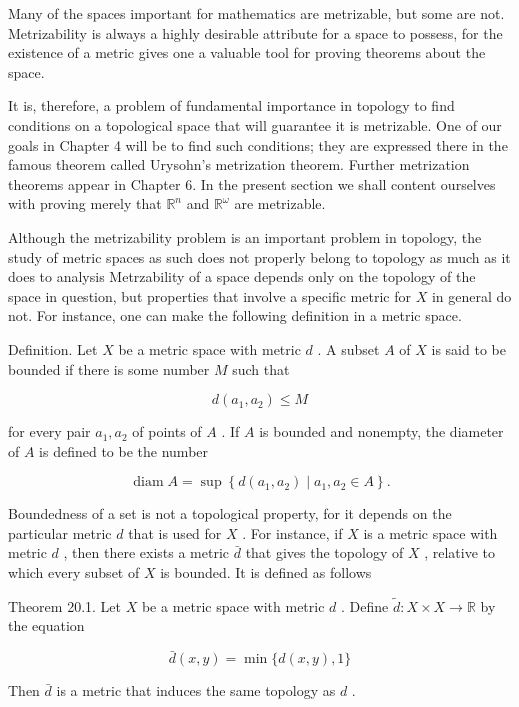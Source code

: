 Many of the spaces important for mathematics are metrizable, but some are not. Metrizability is always a highly desirable attribute for a space to possess, for the existence of a metric gives one a valuable tool for proving theorems about the space.

It is, therefore, a problem of fundamental importance in topology to find conditions on a topological space that will guarantee it is metrizable. One of our goals in Chapter 4 will be to find such conditions; they are expressed there in the famous theorem called Urysohn's metrization theorem. Further metrization theorems appear in Chapter 6. In the present section we shall content ourselves with proving merely that \({\mathbb{R}}^{n}\) and \({\mathbb{R}}^{\omega }\) are metrizable.

Although the metrizability problem is an important problem in topology, the study of metric spaces as such does not properly belong to topology as much as it does to analysis Metrzability of a space depends only on the topology of the space in question, but properties that involve a specific metric for \(X\) in general do not. For instance, one can make the following definition in a metric space.

Definition. Let \(X\) be a metric space with metric \(d\) . A subset \(A\) of \(X\) is said to be bounded if there is some number \(M\) such that

\[
d\left( {{a}_{1},{a}_{2}}\right)  \leq  M
\]

for every pair \({a}_{1},{a}_{2}\) of points of \(A\) . If \(A\) is bounded and nonempty, the diameter of \(A\) is defined to be the number

\[
\operatorname{diam}A = \sup \left\{  {d\left( {{a}_{1},{a}_{2}}\right)  \mid  {a}_{1},{a}_{2} \in  A}\right\}  .
\]

Boundedness of a set is not a topological property, for it depends on the particular metric \(d\) that is used for \(X\) . For instance, if \(X\) is a metric space with metric \(d\) , then there exists a metric \(\bar{d}\) that gives the topology of \(X\) , relative to which every subset of \(X\) is bounded. It is defined as follows

Theorem 20.1. Let \(X\) be a metric space with metric \(d\) . Define \(\widetilde{d} : X \times  X \rightarrow  \mathbb{R}\) by the equation

\[
\bar{d}\left( {x,y}\right)  = \min \{ d\left( {x,y}\right) ,1\}
\]

Then \(\bar{d}\) is a metric that induces the same topology as \(d\) .

